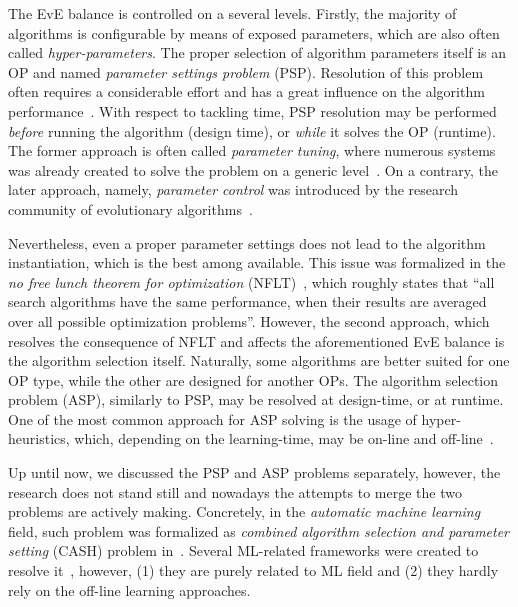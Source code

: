 The EvE balance is controlled on a several levels. Firstly, the majority of algorithms is configurable by means of exposed parameters, which are also often called \emph{hyper-parameters}. The proper selection of algorithm parameters itself is an OP and named \emph{parameter settings problem} (PSP). Resolution of this problem often requires a considerable effort and has a great influence on the algorithm performance~\cite{lavesson2006quantifying}. With respect to tackling time, PSP resolution may be performed \emph{before} running the algorithm (design time), or \emph{while} it solves the OP (runtime). The former approach is often called \emph{parameter tuning}, where numerous systems was already created to solve the problem on a generic level~\cite{hutter2009paramils,hutter2011sequential,lopez2016irace,falkner2018bohb,brise2spl}. On a contrary, the later approach, namely, \emph{parameter control} was introduced by the research community of evolutionary algorithms~\cite{karafotias2014parameter}.

Nevertheless, even a proper parameter settings does not lead to the algorithm instantiation, which is the best among available. This issue was formalized in the \emph{no free lunch theorem for optimization} (NFLT)~\cite{wolpert1997no}, which roughly states that ``all search algorithms have the same performance, when their results are averaged over all possible optimization problems''. However, the second approach, which resolves the consequence of NFLT and affects the aforementioned EvE balance is the algorithm selection itself. Naturally, some algorithms are better suited for one OP type, while the other are designed for another OPs. The algorithm selection problem (ASP), similarly to PSP, may be resolved at design-time, or at runtime. One of the most common approach for ASP solving is the usage of hyper-heuristics, which, depending on the learning-time, may be on-line and off-line~\cite{burke2019classification}. 

Up until now, we discussed the PSP and ASP problems separately, however, the research does not stand still and nowadays the attempts to merge the two problems are actively making. Concretely, in the \emph{automatic machine learning} field, such problem was formalized as \emph{combined algorithm selection and parameter setting} (CASH) problem in~\cite{thornton2013auto}. Several ML-related frameworks were created to resolve it~\cite{thornton2013auto,feurer2015efficient,olson2019tpot}, however, (1) they are purely related to ML field and (2) they hardly rely on the off-line learning approaches.



